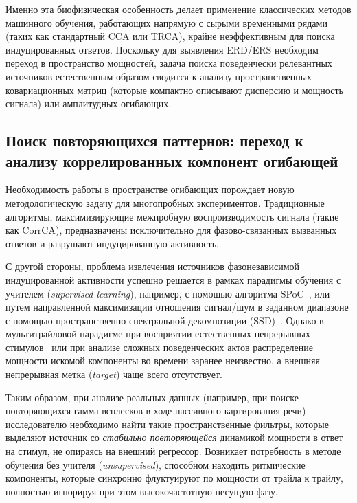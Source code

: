 Именно эта биофизическая особенность делает применение классических методов машинного обучения, работающих напрямую с сырыми временными рядами (таких как стандартный CCA или TRCA), крайне неэффективным для поиска индуцированных ответов. Поскольку для выявления ERD/ERS необходим переход в пространство мощностей, задача поиска поведенчески релевантных источников естественным образом сводится к анализу пространственных ковариационных матриц (которые компактно описывают дисперсию и мощность сигнала) или амплитудных огибающих.

\subsection{Поиск повторяющихся паттернов: переход к анализу коррелированных компонент огибающей}
\label{sec:transition_to_ecca}

Необходимость работы в пространстве огибающих порождает новую методологическую задачу для многопробных экспериментов. Традиционные алгоритмы, максимизирующие межпробную воспроизводимость сигнала (такие как CorrCA), предназначены исключительно для фазово-связанных вызванных ответов и разрушают индуцированную активность. 

С другой стороны, проблема извлечения источников фазонезависимой индуцированной активности успешно решается в рамках парадигмы обучения с учителем (\textit{supervised learning}), например, с помощью алгоритма SPoC~\cite{dahne2014spoc}, или путем направленной максимизации отношения сигнал/шум в заданном диапазоне с помощью пространственно-спектральной декомпозиции (SSD)~\cite{nikulin2011novel}. Однако в мультитрайловой парадигме при восприятии естественных непрерывных стимулов~\cite{hasson2004intersubject} или при анализе сложных поведенческих актов распределение мощности искомой компоненты во времени заранее неизвестно, а внешняя непрерывная метка (\textit{target}) чаще всего отсутствует.

Таким образом, при анализе реальных данных (например, при поиске повторяющихся гамма-всплесков в ходе пассивного картирования речи) исследователю необходимо найти такие пространственные фильтры, которые выделяют источник со \textit{стабильно повторяющейся} динамикой мощности в ответ на стимул, не опираясь на внешний регрессор. Возникает потребность в методе обучения без учителя (\textit{unsupervised}), способном находить ритмические компоненты, которые синхронно флуктуируют по мощности от трайла к трайлу, полностью игнорируя при этом высокочастотную несущую фазу.

